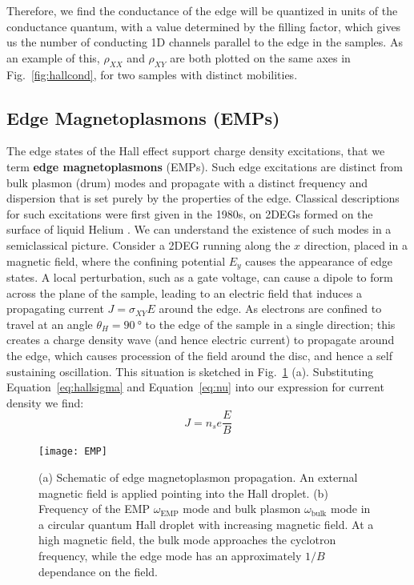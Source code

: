 Therefore, we find the conductance of the edge will be quantized in units of the conductance quantum, with a value determined
by the filling factor, which gives us the number of conducting 1D channels parallel to the edge in the samples. As an example of this,
$\rho_{XX}$ and $\rho_{XY}$ are both plotted on the same axes in Fig.~\ref{fig:hallcond}, for two samples with distinct mobilities.

\subsection{Edge Magnetoplasmons (EMPs)}
\label{sec:emp}
The edge states of the Hall effect support charge density excitations, that we term \textbf{edge magnetoplasmons} (EMPs).
Such edge excitations are distinct from bulk plasmon (drum) modes and propagate with
a distinct frequency and dispersion that is set purely by the properties of the edge. Classical descriptions for such excitations
were first given in the 1980s, on 2DEGs formed on the surface of liquid Helium \cite{PhysRevLett.54.1706,PhysRevB.32.7676,1985ZhPmR..42..450V}.
We can understand the existence of such modes in a semiclassical picture. Consider a 2DEG running along the $x$ direction, placed in a magnetic field,
where the confining potential $E_y$ causes the appearance of edge states. A local perturbation, such as a gate voltage, can cause a dipole to form across
the plane of the sample, leading to an electric field that induces a propagating current $J = \sigma_{XY}E$ around the edge. As electrons are confined to travel at an
angle $\theta_H = \SI{90}{\degree}$ to the edge of the sample in a single direction; this creates a charge density wave (and hence electric current) to
propagate around the edge, which causes procession of the field around the disc, and hence a self sustaining oscillation.
This situation is sketched in Fig.~\ref{fig:EMP} (a). Substituting Equation~\ref{eq:hallsigma} and Equation~\ref{eq:nu} into our expression for current density we find:
\begin{equation}
  J = n_s e \frac{E}{B}
\end{equation}

\begin{figure}
  \texttt{[image: EMP]}
  \caption[Edge magnetoplasmons]
  {\label{fig:EMP}(a) Schematic of edge magnetoplasmon propagation. An external magnetic field is applied pointing into the Hall droplet.
  (b) Frequency of the EMP $\omega_\textrm{EMP}$ mode and bulk plasmon $\omega_\textrm{bulk}$ mode in a circular quantum Hall droplet
  with increasing magnetic field. At a high magnetic field, the bulk mode approaches the cyclotron frequency, while the edge mode has an approximately
  $1/B$ dependance on the field.}
\end{figure}


